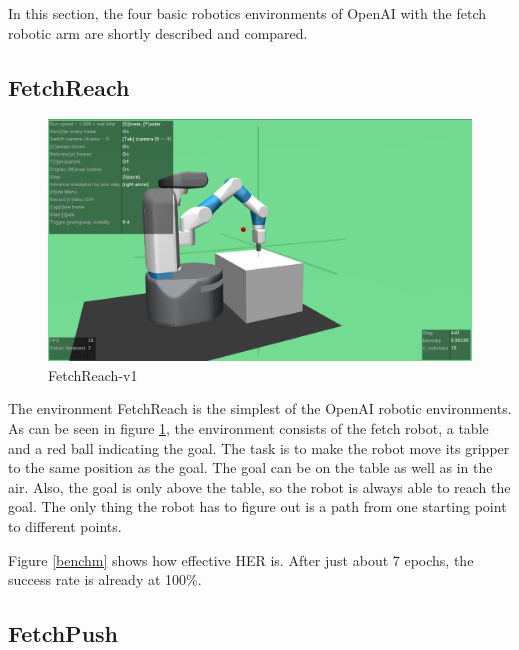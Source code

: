 In this section, the four basic robotics environments of OpenAI with the fetch robotic arm are shortly described and compared.

\subsection{FetchReach}

\begin{figure} [h]
	
	\centering
	\includegraphics[width=1\textwidth]{figures/FetchReach-v1.pdf}
	\caption{FetchReach-v1}
	\label{reach1}
\end{figure} 

The environment FetchReach is the simplest of the OpenAI robotic environments. As can be seen in figure \ref{reach1}, the environment consists of the fetch robot, a table and a red ball indicating the goal. The task is to make the robot move its gripper to the same position as the goal. The goal can be on the table as well as in the air. Also, the goal is only above the table, so the robot is always able to reach the goal. The only thing the robot has to figure out is a path from one starting point to different points.

\vspace{0.5cm}

Figure \ref{benchm} shows how effective HER is.  After just about 7 epochs, the success rate is already at 100\%.




\subsection{FetchPush}

